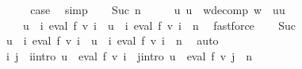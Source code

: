 \begin{isabellebody}
\ \ \isamarkupfalse%
\ \isamarkupfalse%
\ {\isacharquery}{\kern0pt}case\ \isamarkupfalse%
\ simp\isanewline
{}\isamarkupfalse%
\isanewline
\ \ \isamarkupfalse%
\ {\isacharparenleft}{\kern0pt}Suc\ n{\isacharparenright}{\kern0pt}\isanewline
\ \ \isamarkupfalse%
\ \isamarkupfalse%
\ u\ u{\isacharprime}{\kern0pt}\ \ w{\isacharunderscore}{\kern0pt}decomp{\isacharcolon}{\kern0pt}\ {\isachardoublequoteopen}w\ {\isacharequal}{\kern0pt}\ u{\isacharat}{\kern0pt}u{\isacharprime}{\kern0pt}{\isachardoublequoteclose}\ \isanewline
\ \ \ \ {\isachardoublequoteopen}u\ {\isasymin}\ {\isacharparenleft}{\kern0pt}{\isasymUnion}i{\isachardot}{\kern0pt}\ eval\ f\ {\isacharparenleft}{\kern0pt}v\ i{\isacharparenright}{\kern0pt}{\isacharparenright}{\kern0pt}\ {\isasymand}\ u{\isacharprime}{\kern0pt}\ {\isasymin}\ {\isacharparenleft}{\kern0pt}{\isasymUnion}i{\isachardot}{\kern0pt}\ eval\ f\ {\isacharparenleft}{\kern0pt}v\ i{\isacharparenright}{\kern0pt}{\isacharparenright}{\kern0pt}\ {\isacharcircum}{\kern0pt}{\isacharcircum}{\kern0pt}\ n{\isachardoublequoteclose}\ \isamarkupfalse%
\ fastforce\isanewline
\ \ \isamarkupfalse%
\ Suc\ \isamarkupfalse%
\ {\isachardoublequoteopen}u\ {\isasymin}\ {\isacharparenleft}{\kern0pt}{\isasymUnion}i{\isachardot}{\kern0pt}\ eval\ f\ {\isacharparenleft}{\kern0pt}v\ i{\isacharparenright}{\kern0pt}{\isacharparenright}{\kern0pt}\ {\isasymand}\ u{\isacharprime}{\kern0pt}\ {\isasymin}\ {\isacharparenleft}{\kern0pt}{\isasymUnion}i{\isachardot}{\kern0pt}\ eval\ f\ {\isacharparenleft}{\kern0pt}v\ i{\isacharparenright}{\kern0pt}\ {\isacharcircum}{\kern0pt}{\isacharcircum}{\kern0pt}\ n{\isacharparenright}{\kern0pt}{\isachardoublequoteclose}\ \isamarkupfalse%
\ auto\isanewline
\ \ \isamarkupfalse%
\ \isamarkupfalse%
\ i\ j\ \ i{\isacharunderscore}{\kern0pt}intro{\isacharcolon}{\kern0pt}\ {\isachardoublequoteopen}u\ {\isasymin}\ eval\ f\ {\isacharparenleft}{\kern0pt}v\ i{\isacharparenright}{\kern0pt}{\isachardoublequoteclose}\ \ j{\isacharunderscore}{\kern0pt}intro{\isacharcolon}{\kern0pt}\ {\isachardoublequoteopen}u{\isacharprime}{\kern0pt}\ {\isasymin}\ eval\ f\ {\isacharparenleft}{\kern0pt}v\ j{\isacharparenright}{\kern0pt}\ {\isacharcircum}{\kern0pt}{\isacharcircum}{\kern0pt}\ n{\isachardoublequoteclose}\ \isamarkupfalse%

\end{isabellebody}
